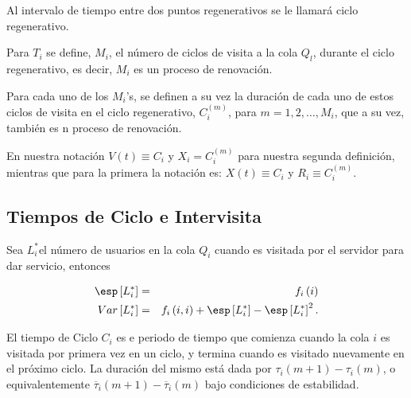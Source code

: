 \begin{Def}
Al intervalo de tiempo entre dos puntos regenerativos se le llamar\'a ciclo regenerativo.
\end{Def}

\begin{Def}
Para $T_{i}$ se define, $M_{i}$, el n\'umero de ciclos de visita a la cola $Q_{l}$, durante el ciclo regenerativo, es decir, $M_{i}$ es un proceso de renovaci\'on.
\end{Def}

\begin{Def}
Para cada uno de los $M_{i}$'s, se definen a su vez la duraci\'on de cada uno de estos ciclos de visita en el ciclo regenerativo, $C_{i}^{(m)}$, para $m=1,2,\ldots,M_{i}$, que a su vez, tambi\'en es n proceso de renovaci\'on.
\end{Def}

En nuestra notaci\'on $V\left(t\right)\equiv C_{i}$ y $X_{i}=C_{i}^{(m)}$ para nuestra segunda definici\'on, mientras que para la primera la notaci\'on es: $X\left(t\right)\equiv C_{i}$ y $R_{i}\equiv C_{i}^{(m)}$.


\subsection{Tiempos de Ciclo e Intervisita}


\begin{Def}
Sea $L_{i}^{*}$el n\'umero de usuarios en la cola $Q_{i}$ cuando es visitada por el servidor para dar servicio, entonces

\begin{eqnarray}
\esp\left[L_{i}^{*}\right]&=&f_{i}\left(i\right)\\
Var\left[L_{i}^{*}\right]&=&f_{i}\left(i,i\right)+\esp\left[L_{i}^{*}\right]-\esp\left[L_{i}^{*}\right]^{2}.
\end{eqnarray}

\end{Def}

\begin{Def}
El tiempo de Ciclo $C_{i}$ es e periodo de tiempo que comienza cuando la cola $i$ es visitada por primera vez en un ciclo, y termina cuando es visitado nuevamente en el pr\'oximo ciclo. La duraci\'on del mismo est\'a dada por $\tau_{i}\left(m+1\right)-\tau_{i}\left(m\right)$, o equivalentemente $\overline{\tau}_{i}\left(m+1\right)-\overline{\tau}_{i}\left(m\right)$ bajo condiciones de estabilidad.
\end{Def}

